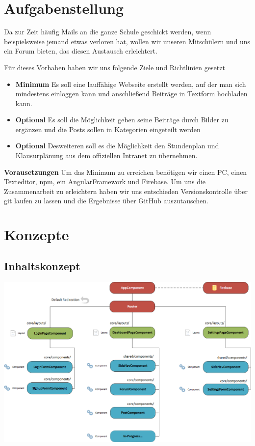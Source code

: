\documentclass[12pt,titlepage]{article}
\begin{document}
\pagebreak

\section{Aufgabenstellung}


Da zur Zeit häufig Mails an die ganze Schule geschickt werden, wenn beispielsweise jemand etwas verloren hat, wollen wir unseren Mitschülern und uns ein Forum bieten, das diesen Austausch erleichtert.

Für dieses Vorhaben haben wir uns folgende Ziele und Richtlinien gesetzt

\begin{itemize}
\item
\textbf{Minimum}
  Es soll eine lauffähige Webseite erstellt werden, auf der man sich mindestens einloggen kann und anschließend Beiträge in Textform hochladen kann. 
\item
\textbf{Optional}
  Es soll die Möglichkeit geben seine Beiträge durch Bilder zu ergänzen und die Posts sollen in Kategorien eingeteilt werden
\item
\textbf{Optional}
Desweiteren soll es die Möglichkeit den Stundenplan und Klausurplänung aus dem offiziellen Intranet zu übernehmen.

\end{itemize}


\textbf{Vorausetzungen}
Um das Minimum zu erreichen benötigen wir einen PC, einen Texteditor, npm, ein AngularFramework und Firebase. Um uns die Zusammenarbeit zu erleichtern haben wir uns entschieden Versionskontrolle über git laufen zu lassen und die Ergebnisse über GitHub auszutauschen. 

\newpage
\section{Konzepte}

\subsection{Inhaltskonzept}

\vspace{2cm}

\includegraphics[width=400pt]{Konzepte/bibnow_Sitemap.png}
\end{document}
